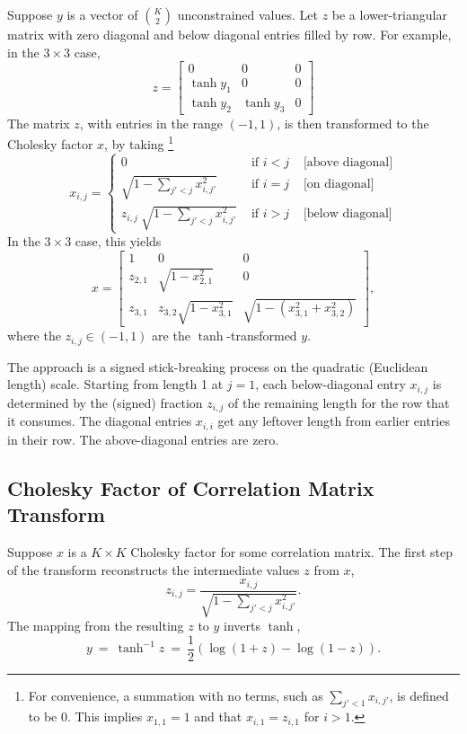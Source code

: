 Suppose $y$ is a vector of $\binom{K}{2}$ unconstrained values.  Let
$z$ be a lower-triangular matrix with zero diagonal and below
diagonal entries filled by row.  For example, in the $3 \times 3$
case,
\[
z =
\left[
\begin{array}{ccc}
0 & 0 & 0
\\
\tanh y_1 & 0 & 0
\\
\tanh y_2 & \tanh y_3 & 0
\end{array}
\right]
\]
%
The matrix $z$, with entries in the range $(-1,1)$, is then
transformed to the Cholesky factor $x$, by taking%
%
\footnote{For convenience, a summation with no terms, such as
  $\sum_{j' < 1} x_{i,j'}$, is defined to be 0.  This implies
  $x_{1,1} = 1$ and that $x_{i,1} = z_{i,1}$ for $i > 1$.}
%
\[
x_{i,j}
=
\left\{
\begin{array}{lll}
0 & \mbox{ if } i < j & \mbox{ [above diagonal]}
\\[12pt]
\sqrt{1 - \sum_{j' < j} x_{i,j'}^2}
  & \mbox{ if } i = j & \mbox{ [on diagonal]}
\\[12pt]
z_{i,j} \ \sqrt{1 - \sum_{j' < j} x_{i,j'}^2}
  & \mbox{ if } i > j & \mbox{ [below diagonal]}
\end{array}
\right.
\]
%
In the $3 \times 3$ case, this yields
\[
x =
\left[
\begin{array}{ccc}
1 & 0 & 0
\\[6pt]
z_{2,1} & \sqrt{1 - x_{2,1}^2} & 0
\\[6pt]
z_{3,1} & z_{3,2} \sqrt{1 - x_{3,1}^2}
        & \sqrt{1 - (x_{3,1}^2 + x_{3,2}^2)}
\end{array}
\right],
\]
where the $z_{i,j} \in (-1,1)$ are the $\tanh$-transformed $y$.

The approach is a signed stick-breaking process on the quadratic
(Euclidean length) scale.  Starting from length 1 at $j=1$, each
below-diagonal entry $x_{i,j}$ is determined by the (signed) fraction
$z_{i,j}$ of the remaining length for the row that it consumes. The
diagonal entries $x_{i,i}$ get any leftover length from earlier
entries in their row.  The above-diagonal entries are zero.

\subsection{Cholesky Factor of Correlation Matrix Transform}

Suppose $x$ is a $K \times K$ Cholesky factor for some correlation
matrix.  The first step of the transform reconstructs the intermediate
values $z$ from $x$,
\[
z_{i,j} = \frac{x_{i,j}}{\sqrt{1 - \sum_{j' < j}x_{i,j'}^2}}.
\]
%
The mapping from the resulting $z$ to $y$ inverts
$\tanh$,
\[
y
\ = \
\tanh^{-1} z
\ = \
\frac{1}{2} \left( \log (1 + z) - \log (1 - z) \right).
\]
%


